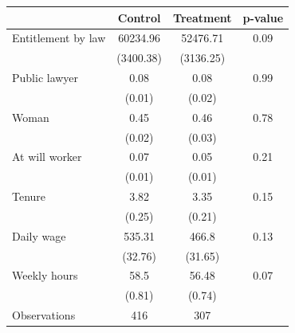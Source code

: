 \begin{tabular}{lccc}
\toprule
      & Control & Treatment & p-value \\
\midrule
\midrule
Entitlement by law & 60234.96 & 52476.71 & 0.09 \\
      & (3400.38) & (3136.25) &  \\
Public lawyer & 0.08  & 0.08  & 0.99 \\
      & (0.01) & (0.02) &  \\
Woman & 0.45  & 0.46  & 0.78 \\
      & (0.02) & (0.03) &  \\
At will worker & 0.07  & 0.05  & 0.21 \\
      & (0.01) & (0.01) &  \\
Tenure & 3.82  & 3.35  & 0.15 \\
      & (0.25) & (0.21) &  \\
Daily wage & 535.31 & 466.8 & 0.13 \\
      & (32.76) & (31.65) &  \\
Weekly hours & 58.5  & 56.48 & 0.07 \\
      & (0.81) & (0.74) &  \\
\midrule
Observations & 416   & 307   &  \\
\bottomrule
\bottomrule
\end{tabular}%
